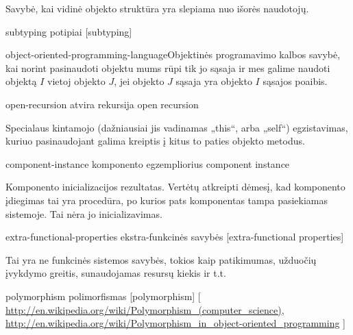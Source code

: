 \begin{glossary}
\begin{entry}
    Savybė, kai vidinė objekto struktūra yra slepiama nuo išorės
    naudotojų. \cite[225]{types-and-programming-languages}
    
  \end{entry}

  \begin{entry}%
    {subtyping}%
    {potipiai}%
    [subtyping]

    \gls{object-oriented-programming-language}{Objektinės programavimo
    kalbos} savybė, kai norint pasinaudoti objektu mums rūpi tik
    jo sąsaja ir mes galime naudoti objektą $I$ vietoj
    objekto $J$, jei objekto $J$ sąsaja yra objekto $I$ sąsajos poaibis.
    \cite[226]{types-and-programming-languages}
    
  \end{entry}

  \begin{entry}%
    {open-recursion}%
    {atvira rekursija}%
    {open recursion}

    Specialaus kintamojo (dažniausiai jis vadinamas „this“, arba
    „self“) egzistavimas, kuriuo pasinaudojant galima kreiptis į
    kitus to paties objekto metodus.
    \cite[226]{types-and-programming-languages}
    
  \end{entry}

  \begin{entry}%
    {component-instance}%
    {komponento egzempliorius}%
    {component instance}

    Komponento inicializacijos rezultatas. Vertėtų atkreipti dėmesį,
    kad komponento įdiegimas tai yra procedūra, po kurios pats
    komponentas tampa pasiekiamas sistemoje. Tai nėra jo inicializavimas.
    
  \end{entry}

  \begin{entry}%
    {extra-functional-properties}%
    {ekstra-funkcinės savybės}%
    [extra-functional properties]

    Tai yra ne funkcinės sistemos savybės, tokios kaip patikimumas,
    užduočių įvykdymo greitis, sunaudojamas resursų kiekis ir t.t.
  
  \end{entry}


  \begin{entry}%
    {polymorphism}%
    {polimorfismas}%
    [polymorphism]%
    [%
    \url{http://en.wikipedia.org/wiki/Polymorphism_(computer_science)}, %
    \url{http://en.wikipedia.org/wiki/Polymorphism_in_object-oriented_programming}%
    ]%


\end{entry}
\end{glossary}
